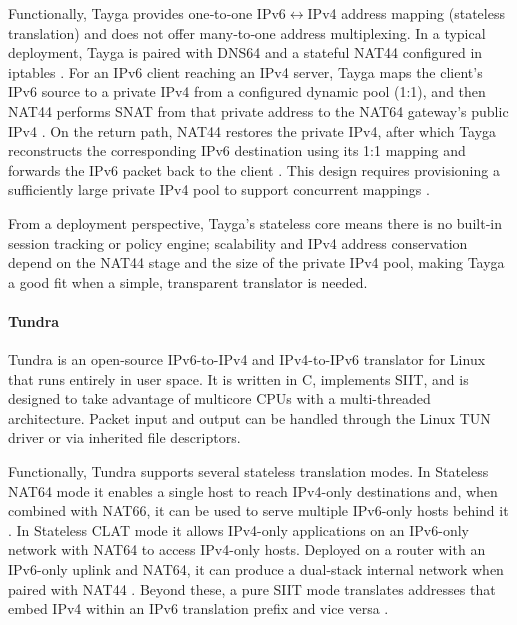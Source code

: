 Functionally, Tayga provides one‑to‑one IPv6$\leftrightarrow$IPv4 address mapping (stateless translation) and does not offer many‑to‑one address multiplexing. In a typical deployment, Tayga is paired with DNS64 and a stateful NAT44 configured in iptables \cite{Repas_Farnadi_Lencse_2014}. For an IPv6 client reaching an IPv4 server, Tayga maps the client’s IPv6 source to a private IPv4 from a configured dynamic pool (1:1), and then NAT44 performs SNAT from that private address to the NAT64 gateway’s public IPv4 \cite{Repas_Farnadi_Lencse_2014}. On the return path, NAT44 restores the private IPv4, after which Tayga reconstructs the corresponding IPv6 destination using its 1:1 mapping and forwards the IPv6 packet back to the client \cite{Repas_Farnadi_Lencse_2014}. This design requires provisioning a sufficiently large private IPv4 pool to support concurrent mappings \cite{Repas_Farnadi_Lencse_2014}.

From a deployment perspective, Tayga’s stateless core means there is no built‑in session tracking or policy engine; scalability and IPv4 address conservation depend on the NAT44 stage and the size of the private IPv4 pool, making Tayga a good fit when a simple, transparent translator is needed\cite{Repas_Farnadi_Lencse_2014}. 

\paragraph{Tundra} 


Tundra is an open-source IPv6-to-IPv4 and IPv4-to-IPv6 translator for Linux that runs entirely in user space. It is written in C, implements SIIT\cite{rfc7915}, and is designed to take advantage of multicore CPUs with a multi-threaded architecture. Packet input and output can be handled through the Linux TUN driver or via inherited file descriptors\cite{labuda_tundra_nat64}.

Functionally, Tundra supports several stateless translation modes. In Stateless NAT64 mode it enables a single host to reach IPv4-only destinations and, when combined with NAT66, it can be used to serve multiple IPv6-only hosts behind it \cite{labuda_tundra_nat64}. In Stateless CLAT mode it allows IPv4-only applications on an IPv6-only network with NAT64 to access IPv4-only hosts. Deployed on a router with an IPv6-only uplink and NAT64, it can produce a dual-stack internal network when paired with NAT44 \cite{labuda_tundra_nat64}. Beyond these, a pure SIIT mode translates addresses that embed IPv4 within an IPv6 translation prefix and vice versa \cite{labuda_tundra_nat64}. 

